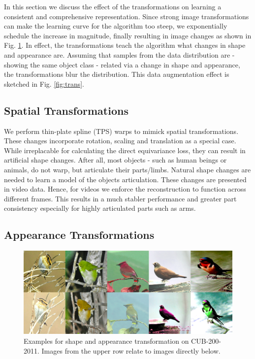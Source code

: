 		In this section we discuss the effect of the transformations on learning a consistent and comprehensive representation.
		Since strong image transformations can make the learning curve for the algorithm too steep, we exponentially schedule the increase in magnitude, finally resulting in image changes as shown in Fig. \ref{fig:coloraugm}.
		In effect, the transformations teach the algorithm what changes in shape and appearance are. Assuming that samples from the data distribution are - showing the same object class - related via a change in shape and appearance, the transformations blur the distribution. This data augmentation effect is sketched in Fig. \ref{fig:trans}.

		\subsection{Spatial Transformations}\label{sec:warps}
			We perform thin-plate spline (TPS) warps to mimick spatial transformations. These changes incorporate rotation, scaling and translation as a special case. While irreplacable for calculating the direct equivariance loss, they can result in artificial shape changes. After all, most objects - such as human beings or animals, do not warp, but articulate their parts/limbs.
			Natural shape changes are needed to learn a model of the objects articulation. These changes are presented in video data. Hence, for videos we enforce the reconstruction to function across different frames. This results in a much stabler performance and greater part consistency especially for highly articulated parts such as arms.

		\subsection{Appearance Transformations}
			\begin{figure}[htp]
				\centering
				\includegraphics[trim={0cm 0cm 0cm 0cm},clip, width=.8\linewidth]{fig/shape/coloraugm}
				\caption{Examples for shape and appearance transformation on CUB-200-2011. Images from the upper row relate to images directly below.}
				\label{fig:coloraugm}
			\end{figure}

